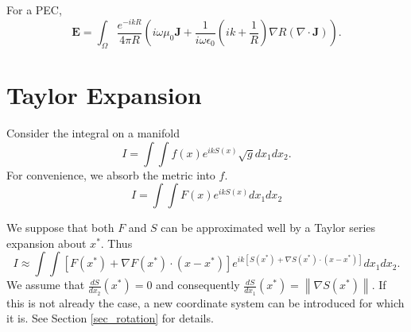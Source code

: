 \documentclass{article}
\newcommand{\norm}[1]{\left\lVert #1 \right\rVert}
\theoremstyle{plain}
\begin{document}
For a PEC,
\begin{equation}
	\mathbf{E} = \int_\Omega \frac{e^{-ikR}}{4\pi R}
	\left( i\omega\mu_0\mathbf{J} 
	+ \frac{1}{i\omega\epsilon_0}\left( ik + \frac{1}{R} \right) \nabla R (\nabla\cdot\mathbf{J}) \right).
\end{equation}


\section{Taylor Expansion}\label{sec_taylor}


Consider the integral on a manifold
\begin{equation}
	I = \int\int f(x) e^{ikS(x)} \sqrt{g} dx_1dx_2.
\end{equation}
For convenience, we absorb the metric into $f$.
\begin{equation}
	I = \int\int F(x) e^{ikS(x)} dx_1dx_2
\end{equation}



We suppose that both $F$ and $S$ can be approximated well by a Taylor series expansion about $x^*$.
Thus
\begin{equation}
	I \approx \int\int \left[ F(x^*) + \nabla F(x^*) \cdot (x-x^*) \right] e^{ik\left[S(x^*) + \nabla S(x^*)\cdot (x-x^*) \right]} dx_1dx_2.
\end{equation}
We assume that $\frac{dS}{dx_2}(x^*) = 0$ and consequently $\frac{dS}{dx_1}(x^*) = \norm{\nabla S(x^*)}$.
If this is not already the case, a new coordinate system can be introduced for which it is. See Section \ref{sec_rotation} for details.
\end{document}

